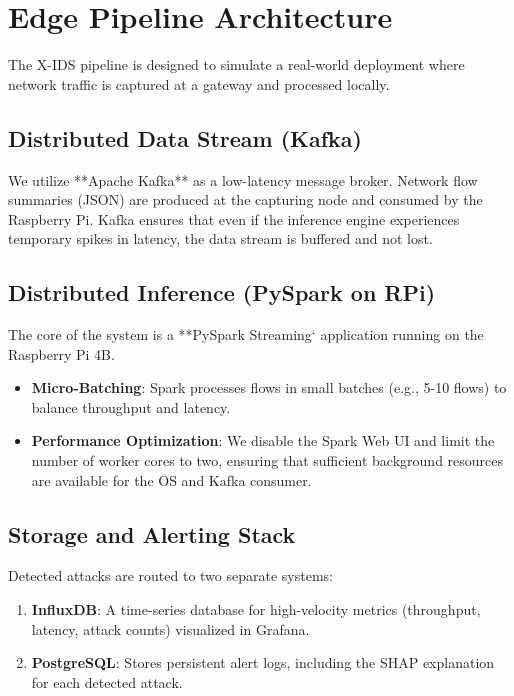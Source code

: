 \section{Edge Pipeline Architecture}
The X-IDS pipeline is designed to simulate a real-world deployment where network traffic is captured at a gateway and processed locally.

\subsection{Distributed Data Stream (Kafka)}
We utilize **Apache Kafka** as a low-latency message broker. Network flow summaries (JSON) are produced at the capturing node and consumed by the Raspberry Pi. Kafka ensures that even if the inference engine experiences temporary spikes in latency, the data stream is buffered and not lost.

\subsection{Distributed Inference (PySpark on RPi)}
The core of the system is a **PySpark Streaming` application running on the Raspberry Pi 4B. 
\begin{itemize}
    \item \textbf{Micro-Batching}: Spark processes flows in small batches (e.g., 5-10 flows) to balance throughput and latency.
    \item \textbf{Performance Optimization}: We disable the Spark Web UI and limit the number of worker cores to two, ensuring that sufficient background resources are available for the OS and Kafka consumer.
\end{itemize}

\subsection{Storage and Alerting Stack}
Detected attacks are routed to two separate systems:
\begin{enumerate}
    \item \textbf{InfluxDB}: A time-series database for high-velocity metrics (throughput, latency, attack counts) visualized in Grafana.
    \item \textbf{PostgreSQL}: Stores persistent alert logs, including the SHAP explanation for each detected attack.
\end{enumerate}
